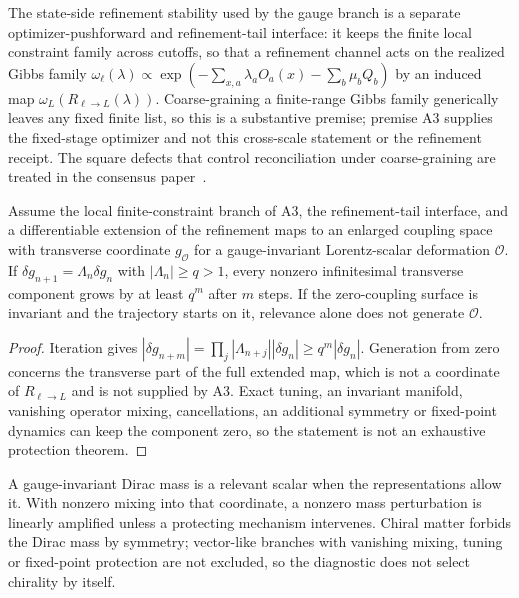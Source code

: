 \documentclass[11pt]{article}
\begin{document}
The state-side refinement stability used by the gauge branch is a separate
optimizer-pushforward and refinement-tail interface: it keeps the finite
local constraint family across cutoffs, so that a refinement channel acts on
the realized Gibbs family
\(\omega_\ell(\lambda)\propto\exp(-\sum_{x,a}\lambda_aO_a(x)-\sum_b\mu_bQ_b)\)
by an induced map \(\omega_L(R_{\ell\to L}(\lambda))\). Coarse-graining a
finite-range Gibbs family generically leaves any fixed finite list, so this is
a substantive premise; premise A3 supplies the fixed-stage optimizer and not
this cross-scale statement or the refinement receipt. The square defects that
control reconciliation under coarse-graining are treated in the consensus
paper~\cite{ophconsensus}.

\begin{proposition}
Assume the local finite-constraint branch of A3, the refinement-tail
interface, and a differentiable extension of the refinement maps to an
enlarged coupling space with transverse coordinate \(g_{\mathcal O}\) for a
gauge-invariant Lorentz-scalar deformation \(\mathcal O\). If
\(\delta g_{n+1}=\Lambda_n\delta g_n\) with \(|\Lambda_n|\ge q>1\), every nonzero
infinitesimal transverse component grows by at least \(q^m\) after \(m\)
steps. If the zero-coupling surface is invariant and the trajectory starts on
it, relevance alone does not generate \(\mathcal O\).
\end{proposition}

\begin{proof}
Iteration gives
\(|\delta g_{n+m}|=\prod_{j}|\Lambda_{n+j}||\delta g_n|\ge q^m|\delta g_n|\).
Generation from zero concerns the transverse part of the full extended map,
which is not a coordinate of \(R_{\ell\to L}\) and is not supplied by A3. Exact
tuning, an invariant manifold, vanishing operator mixing, cancellations, an
additional symmetry or fixed-point dynamics can keep the component zero, so
the statement is not an exhaustive protection theorem.
\end{proof}

A gauge-invariant Dirac mass is a relevant scalar when the representations
allow it. With nonzero mixing into that coordinate, a nonzero mass
perturbation is linearly amplified unless a protecting mechanism intervenes.
Chiral matter forbids the Dirac mass by symmetry; vector-like branches with
vanishing mixing, tuning or fixed-point protection are not excluded, so the
diagnostic does not select chirality by itself.
\end{document}

